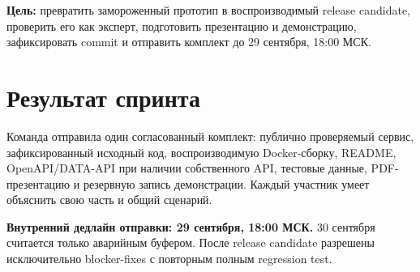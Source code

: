 \documentclass[11pt,a4paper]{article}
\begin{document}
\begin{titlepage}\pagecolor{MaxPurple}\color{white}\par{}\par\vspace{9mm}{\Large 28-29 сентября 2026}\par\vfill
\begin{tcolorbox}[colback=white,colframe=white,arc=3mm,boxrule=0pt]\color{Ink}\textbf{Цель:} превратить замороженный прототип в воспроизводимый release candidate, проверить его как эксперт, подготовить презентацию и демонстрацию, зафиксировать commit и отправить комплект до 29 сентября, 18:00 МСК.\end{tcolorbox}\vspace{8mm}{\large Команда: Данил, Рома, Никита, Амир}\par\end{titlepage}\nopagecolor\color{Ink}

\section{Результат спринта}
\begin{goalbox}
Команда отправила один согласованный комплект: публично проверяемый сервис, зафиксированный исходный код, воспроизводимую Docker-сборку, README, OpenAPI/DATA-API при наличии собственного API, тестовые данные, PDF-презентацию и резервную запись демонстрации. Каждый участник умеет объяснить свою часть и общий сценарий.
\end{goalbox}
\begin{alertbox}
\textbf{Внутренний дедлайн отправки: 29 сентября, 18:00 МСК.} 30 сентября считается только аварийным буфером. После release candidate разрешены исключительно blocker-fixes с повторным полным regression test.
\end{alertbox}
\end{document}
